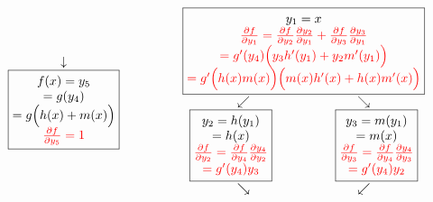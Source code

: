 \begin{equation*}
\begin{matrix}
\begin{matrix}
        \downarrow \\
        \boxed{\begin{matrix}
            f(x) = y_5 \\
            = g(y_4) \\
            = g\Bigl(h(x) + m(x)\Bigr) \\
            \color{red}{\frac{\partial f}{\partial y_5} = 1}
        \end{matrix}}
    \end{matrix} \qquad & \qquad
    \begin{matrix}
        \boxed{\begin{matrix}
            y_1=x \\
            \color{red}{\frac{\partial f}{\partial y_1} = \frac{\partial f}{\partial y_2}\frac{\partial y_2}{\partial y_1} + \frac{\partial f}{\partial y_3}\frac{\partial y_3}{\partial y_1}} \\
            \color{red}{= g'(y_4)\Bigl(y_3 h'(y_1) + y_2 m'(y_1)\Bigr)} \\
            \color{red}{= g'\Bigl(h(x) m(x)\Bigr)\Bigl(m(x)h'(x) + h(x)m'(x)\Bigr)}
        \end{matrix}} \\
        \begin{matrix}
            \swarrow & \searrow \\
            \boxed{\begin{matrix}
                y_2=h(y_1) \\
                =h(x) \\
                \color{red}{\frac{\partial f}{\partial y_2} = \frac{\partial f}{\partial y_4}\frac{\partial y_4}{\partial y_2}} \\
                \color{red}{= g'(y_4)y_3}
            \end{matrix}} \qquad & \qquad
            \boxed{\begin{matrix}
                y_3=m(y_1) \\
                =m(x) \\
                \color{red}{\frac{\partial f}{\partial y_3} = \frac{\partial f}{\partial y_4}\frac{\partial y_4}{\partial y_3}} \\
                \color{red}{= g'(y_4)y_2}
            \end{matrix}} \\
            \searrow & \swarrow \\
        \end{matrix} \\

\end{matrix}
\end{matrix}
\end{equation*}
